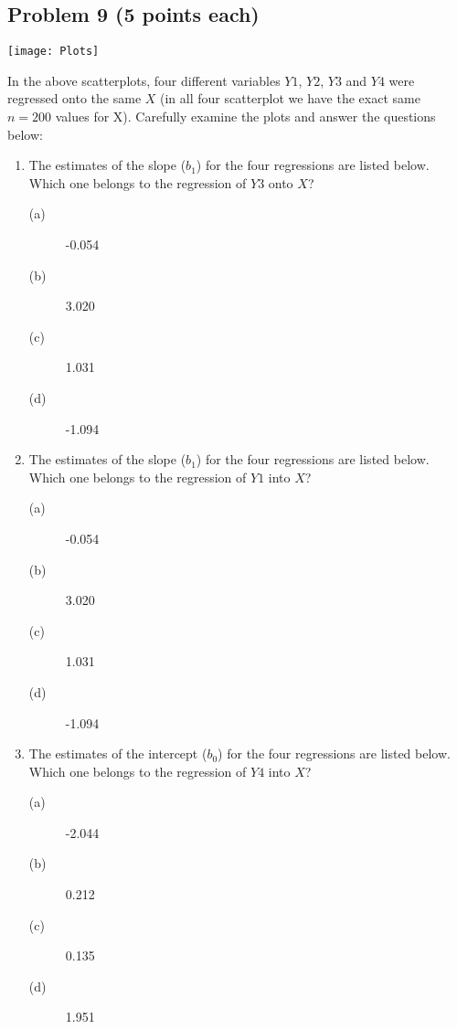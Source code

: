 \documentclass[12pt]{article}
\begin{document}
\subsection*{Problem 9 (5 points each)}

\begin{center}
\texttt{[image: Plots]}
\end{center}

\noindent In the above scatterplots, four different variables $Y1$, $Y2$, $Y3$ and $Y4$ were regressed onto the same $X$ (in all four scatterplot we have the exact same $n=200$ values for X). Carefully examine the plots and answer the questions below:

\begin{enumerate}
\item The estimates of the slope ($b_1$) for the four regressions are listed below. Which one belongs to the regression of $Y3$ onto $X$?
\begin{description}
\item[(a)]-0.054
\item[(b)]3.020
\item[(c)]1.031 
\item[(d)]-1.094
\end{description}


\item The estimates of the slope ($b_1$) for the four regressions are listed below. Which one belongs to the regression of $Y1$ into $X$?
\begin{description}
\item[(a)]-0.054
\item[(b)]3.020
\item[(c)]1.031 
\item[(d)]-1.094
\end{description}

\vspace{1cm}

\item The estimates of the intercept ($b_0$) for the four regressions are listed below. Which one belongs to the regression of $Y4$ into $X$?
\begin{description}
\item[(a)]-2.044
\item[(b)]0.212
\item[(c)]0.135 
\item[(d)]1.951
\end{description}

\vspace{1cm}


\end{enumerate}
\end{document}
